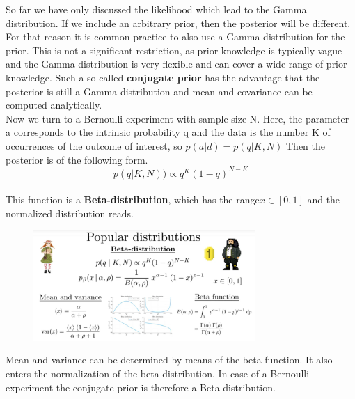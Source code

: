 \documentclass[12pt, a4paper]{scrartcl}
\begin{document}
So far we have only discussed the likelihood which lead to the Gamma distribution. If we include an arbitrary prior, then the posterior will be diﬀerent.
For that reason it is common practice to also use a Gamma distribution for
the prior. This is not a signiﬁcant restriction, as prior knowledge is typically
vague and the Gamma distribution is very ﬂexible and can cover a wide range
of prior knowledge. Such a so-called  \textbf{conjugate prior} has the advantage that
the posterior is still a Gamma distribution and mean and covariance can be
computed analytically.\\


Now we turn to a Bernoulli experiment with sample size N. Here, the parameter a
corresponds to the intrinsic probability q and the data is the number K of
occurrences of the outcome of interest, so $p(a|d)=p(q|K,N)$ Then the posterior is of the following form.
\begin{equation*}\boxed{p(q|K,N))\propto q^K(1-q)^{N-K}
}\end{equation*}\\
This function is a  \textbf{Beta-distribution}, which has the range$x\in [0,1]$ and the
normalized distribution reads.%
 \begin{figure}[H]
	\centering
	\includegraphics[width=0.75\textwidth]{8_12.png}
\end{figure}
Mean and variance
can be determined by means of the beta function.
It also enters the normalization of the beta distribution.
In case of a Bernoulli experiment the conjugate prior is therefore a Beta
distribution.\\
\end{document}
